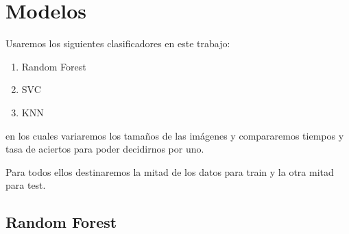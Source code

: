 \documentclass[8pt,a4paper]{article}
\begin{document}
\section{Modelos}

Usaremos los siguientes clasificadores en este trabajo:
\begin{enumerate}
\item Random Forest
\item SVC
\item KNN
\end{enumerate}
en los cuales variaremos los tamaños de las imágenes y compararemos tiempos y tasa de aciertos para poder decidirnos por uno.

Para todos ellos destinaremos la mitad de los datos para train y la otra mitad para test.

\subsection{Random Forest}
\end{document}
